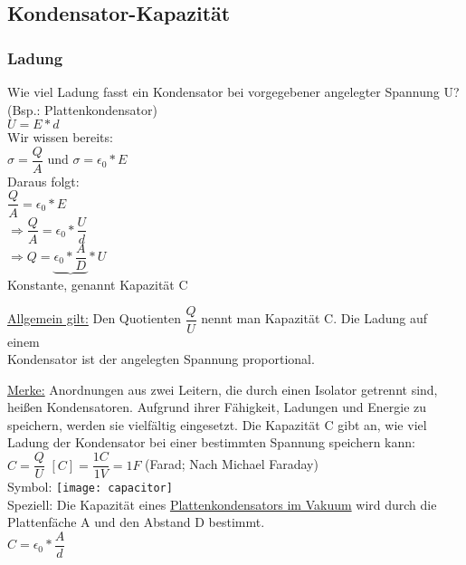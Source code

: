 \subsection{Kondensator-Kapazität}
\subsubsection{Ladung}
Wie viel Ladung fasst ein Kondensator bei vorgegebener angelegter Spannung U? (Bsp.: Plattenkondensator)
\vspace{2mm} \\
$ U = E \ast d $
\vspace{2mm} \\
Wir wissen bereits:
\vspace{2mm} \\
$ \sigma = \dfrac{Q}{A} $ und $ \sigma = \epsilon_{0} \ast E $
\vspace{2mm} \\
Daraus folgt:
\vspace{2mm} \\
\hspace{5mm}$ \dfrac{Q}{A} = \epsilon_{0} \ast E $\\ \vspace{4mm}$ \Rightarrow \dfrac{Q}{A} = \epsilon_{0} \ast \dfrac{U}{d} $\\ \vspace{4mm}$ \Rightarrow Q = \underbrace{\epsilon_{0} \ast \dfrac{A}{D}} \ast U $ \\
Konstante, genannt Kapazität C	

\vspace{5mm}
\underline{Allgemein gilt:}
Den Quotienten $\dfrac{Q}{U}$ nennt man Kapazität C. Die Ladung auf einem \\ \vspace{2mm}
Kondensator ist der angelegten Spannung proportional.

\vspace{5mm}
\underline{Merke:}
Anordnungen aus zwei Leitern, die durch einen Isolator getrennt sind, heißen Kondensatoren. Aufgrund ihrer Fähigkeit, Ladungen und Energie zu speichern, werden sie vielfältig eingesetzt. Die Kapazität C gibt an, wie viel Ladung der Kondensator bei einer bestimmten Spannung speichern kann:
\vspace{2mm} \\
$ C = \dfrac{Q}{U} $ \hspace{5mm} $ [C] = \dfrac{1C}{1V} = 1F $ (Farad; Nach Michael Faraday)
\vspace{5mm} \\
Symbol: \texttt{[image: capacitor]}
\vspace{5mm} \\
Speziell: Die Kapazität eines \underline{Plattenkondensators im Vakuum} wird durch die Plattenfäche A und den Abstand D bestimmt. 
\vspace{2mm} \\
$ C = \epsilon_{0} \ast \dfrac{A}{d} $
\newpage
